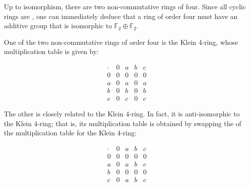 \documentclass[12pt]{article}
\begin{document}

Up to isomorphism, there are two non-commutative rings of  four.  Since all cyclic rings are , one can immediately deduce that a ring of order four must have an additive group that is isomorphic to $\mathbb{F}_2 \oplus \mathbb{F}_2$.

One of the two non-commutative rings of order four is the Klein 4-ring, whose multiplication table is given by:

$$\begin{array}{c|cccc}
\cdot & 0 & a & b & c \\
\hline
0 & 0 & 0 & 0 & 0 \\
a & 0 & a & 0 & a \\
b & 0 & b & 0 & b \\
c & 0 & c & 0 & c \end{array}$$

The other is closely related to the Klein 4-ring.  In fact, it is anti-isomorphic to the Klein 4-ring; that is, its multiplication table is obtained by swapping the  of the multiplication table for the Klein 4-ring:

$$\begin{array}{c|cccc}
\cdot & 0 & a & b & c \\
\hline
0 & 0 & 0 & 0 & 0 \\
a & 0 & a & b & c \\
b & 0 & 0 & 0 & 0 \\
c & 0 & a & b & c \end{array}$$
\end{document}
